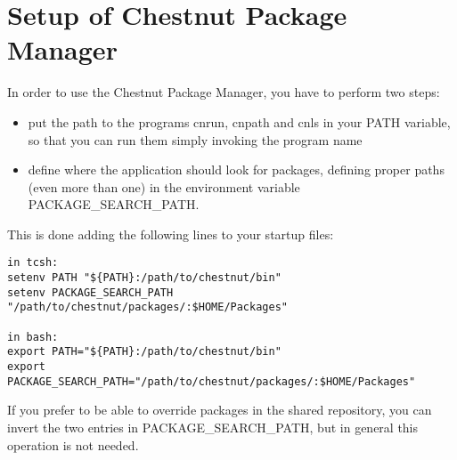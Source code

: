 \section{Setup of Chestnut Package Manager}

In order to use the Chestnut Package Manager, you have to perform two steps:
\begin{itemize}
\item put the path to the programs cnrun, cnpath and cnls in your
PATH variable, so that you can run them simply invoking the program name
\item define where the application should look for packages, defining
proper paths (even more than one) in the environment variable
PACKAGE\_SEARCH\_PATH.
\end{itemize}

This is done adding the following lines to your startup files:
\begin{verbatim}
in tcsh:
setenv PATH "${PATH}:/path/to/chestnut/bin"
setenv PACKAGE_SEARCH_PATH "/path/to/chestnut/packages/:$HOME/Packages"

in bash:
export PATH="${PATH}:/path/to/chestnut/bin"
export PACKAGE_SEARCH_PATH="/path/to/chestnut/packages/:$HOME/Packages"
\end{verbatim}

If you prefer to be able to override packages in the shared repository, you
can invert the two entries in PACKAGE\_SEARCH\_PATH, but in general this
operation is not needed.
